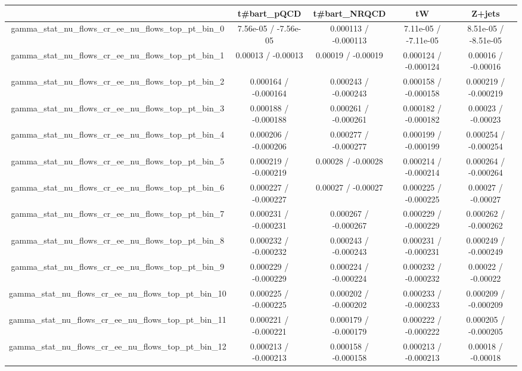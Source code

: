 \documentclass[10pt]{article}
\begin{document}
\begin{table}[htbp]
\begin{center}
\begin{tabular}{|c|c|c|c|c|}
\hline 
      & t#bar{t}_{pQCD}      & t#bar{t}_{NRQCD}      & tW      & Z+jets \\ 
\hline 
  gamma_stat_nu_flows_cr_ee_nu_flows_top_pt_bin_0 & 7.56e-05 / -7.56e-05 & 0.000113 / -0.000113 & 7.11e-05 / -7.11e-05 & 8.51e-05 / -8.51e-05 \\ 
  gamma_stat_nu_flows_cr_ee_nu_flows_top_pt_bin_1 & 0.00013 / -0.00013 & 0.00019 / -0.00019 & 0.000124 / -0.000124 & 0.00016 / -0.00016 \\ 
  gamma_stat_nu_flows_cr_ee_nu_flows_top_pt_bin_2 & 0.000164 / -0.000164 & 0.000243 / -0.000243 & 0.000158 / -0.000158 & 0.000219 / -0.000219 \\ 
  gamma_stat_nu_flows_cr_ee_nu_flows_top_pt_bin_3 & 0.000188 / -0.000188 & 0.000261 / -0.000261 & 0.000182 / -0.000182 & 0.00023 / -0.00023 \\ 
  gamma_stat_nu_flows_cr_ee_nu_flows_top_pt_bin_4 & 0.000206 / -0.000206 & 0.000277 / -0.000277 & 0.000199 / -0.000199 & 0.000254 / -0.000254 \\ 
  gamma_stat_nu_flows_cr_ee_nu_flows_top_pt_bin_5 & 0.000219 / -0.000219 & 0.00028 / -0.00028 & 0.000214 / -0.000214 & 0.000264 / -0.000264 \\ 
  gamma_stat_nu_flows_cr_ee_nu_flows_top_pt_bin_6 & 0.000227 / -0.000227 & 0.00027 / -0.00027 & 0.000225 / -0.000225 & 0.00027 / -0.00027 \\ 
  gamma_stat_nu_flows_cr_ee_nu_flows_top_pt_bin_7 & 0.000231 / -0.000231 & 0.000267 / -0.000267 & 0.000229 / -0.000229 & 0.000262 / -0.000262 \\ 
  gamma_stat_nu_flows_cr_ee_nu_flows_top_pt_bin_8 & 0.000232 / -0.000232 & 0.000243 / -0.000243 & 0.000231 / -0.000231 & 0.000249 / -0.000249 \\ 
  gamma_stat_nu_flows_cr_ee_nu_flows_top_pt_bin_9 & 0.000229 / -0.000229 & 0.000224 / -0.000224 & 0.000232 / -0.000232 & 0.00022 / -0.00022 \\ 
  gamma_stat_nu_flows_cr_ee_nu_flows_top_pt_bin_10 & 0.000225 / -0.000225 & 0.000202 / -0.000202 & 0.000233 / -0.000233 & 0.000209 / -0.000209 \\ 
  gamma_stat_nu_flows_cr_ee_nu_flows_top_pt_bin_11 & 0.000221 / -0.000221 & 0.000179 / -0.000179 & 0.000222 / -0.000222 & 0.000205 / -0.000205 \\ 
  gamma_stat_nu_flows_cr_ee_nu_flows_top_pt_bin_12 & 0.000213 / -0.000213 & 0.000158 / -0.000158 & 0.000213 / -0.000213 & 0.00018 / -0.00018 \\ 

\end{tabular}
\end{center}
\end{table}
\end{document}
